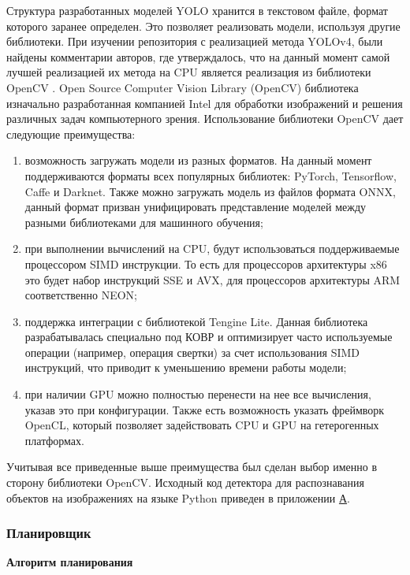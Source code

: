 Структура разработанных моделей YOLO хранится в текстовом файле, формат которого заранее определен. Это позволяет реализовать модели, 
используя другие библиотеки. При изучении репозитория с реализацией метода YOLOv4, были найдены комментарии авторов, где утверждалось, 
что на данный момент самой лучшей реализацией их метода на CPU является реализация из библиотеки OpenCV \cite{YOLO4_IMPL}. 
Open Source Computer Vision Library (OpenCV) библиотека изначально разработанная компанией Intel для обработки изображений 
и решения различных задач компьютерного зрения. Использование библиотеки OpenCV дает следующие преимущества:

\begin{enumerate}
\item возможность загружать модели из разных форматов. На данный момент поддерживаются форматы всех популярных библиотек: 
PyTorch, Tensorflow, Caffe и Darknet. Также можно загружать модель из файлов формата ONNX, данный формат призван 
унифицировать представление моделей между разными библиотеками для машинного обучения;
\item при выполнении вычислений на CPU, будут использоваться поддерживаемые процессором SIMD инструкции. То есть для процессоров 
архитектуры x86 это будет набор инструкций SSE и AVX, для процессоров архитектуры ARM соответственно NEON;
\item поддержка интеграции с библиотекой Tengine Lite. Данная библиотека разрабатывалась специально под КОВР и оптимизирует
часто используемые операции (например, операция свертки) за счет использования SIMD инструкций, что приводит 
к уменьшению времени работы модели;
\item при наличии GPU можно полностью перенести на нее все вычисления, указав это при конфигурации. Также есть возможность 
указать фреймворк OpenCL, который позволяет задействовать CPU и GPU на гетерогенных платформах.
\end{enumerate}

Учитывая все приведенные выше преимущества был сделан выбор именно в сторону библиотеки OpenCV. Исходный код детектора 
для распознавания объектов на изображениях на языке Python приведен в приложении \hyperlink{a-app}{А}.

\subsubsection{Планировщик}

\textbf{Алгоритм планирования}

